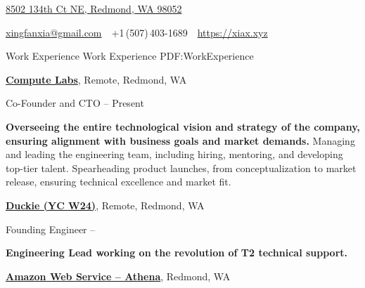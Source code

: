 \documentclass[a4paper,MMMyyyy,nonstopmode]{simpleresumecv}
\newcommand{\CVAuthor}{Xingfan Xia}
\newcommand{\CVWebpage}{https://xiax.xyz}
\begin{document}

\Title{\CVAuthor}

\begin{SubTitle}
\href{https://www.google.com/maps/place/8502+134th+Ct+NE,+Redmond,+WA+98052}
{8502 134th Ct NE, Redmond, WA 98052}
\par
\href{mailto:xingfanxia@gmail.com}
{xingfanxia@gmail.com}
\,\SubBulletSymbol\,
+1\,(507)\,403-1689
\,\SubBulletSymbol\,
\href{\CVWebpage}
{\url{\CVWebpage}}
\end{SubTitle}

\begin{Body}

\Section
{Work\newline
Experience}
{Work Experience}
{PDF:WorkExperience}

\Entry
\href{https://computelabs.com/}
{\textbf{Compute Labs}},
Remote, Redmond, WA

\Gap
\BulletItem
Co-Founder and CTO
\hfill
{} --
Present
\begin{Detail}
\SubBulletItem
\textbf{Overseeing the entire technological vision and strategy of the company, ensuring alignment with business goals and market demands.}
\SubBulletItem
Managing and leading the engineering team, including hiring, mentoring, and developing top-tier talent.
\SubBulletItem
Spearheading product launches, from conceptualization to market release, ensuring technical excellence and market fit.
\end{Detail}

\BigGap
\Entry
\href{https://www.duckie.ai/}
{\textbf{Duckie (YC W24)}},
Remote, Redmond, WA

\Gap
\BulletItem
Founding Engineer
\hfill
{} --
\begin{Detail}
\SubBulletItem
\textbf{Engineering Lead working on the revolution of T2 technical support.}
\end{Detail}

\BigGap
\Entry
\href{https://aws.amazon.com/athena/}
{\textbf{Amazon Web Service -- Athena}},
Redmond, WA


\end{Body}
\end{document}
